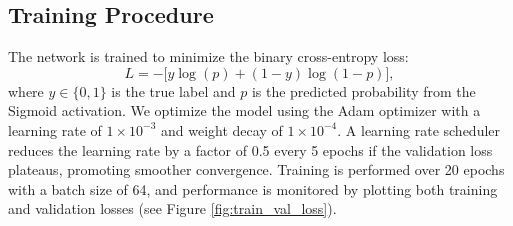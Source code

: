 \documentclass{article}
\begin{document}
\subsection*{Training Procedure}
The network is trained to minimize the binary cross-entropy loss:
\[
L = -\Big[y\log(p) + (1-y)\log(1-p)\Big],
\]
where \(y \in \{0,1\}\) is the true label and \(p\) is the predicted probability from the Sigmoid activation. We optimize the model using the Adam optimizer with a learning rate of \(1 \times 10^{-3}\) and weight decay of \(1 \times 10^{-4}\). A learning rate scheduler reduces the learning rate by a factor of 0.5 every 5 epochs if the validation loss plateaus, promoting smoother convergence. Training is performed over 20 epochs with a batch size of 64, and performance is monitored by plotting both training and validation losses (see Figure \ref{fig:train_val_loss}).
\end{document}
